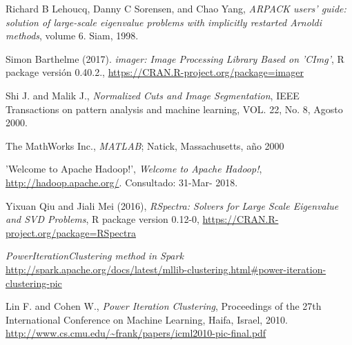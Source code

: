 \documentclass[conference]{IEEEtran}
\begin{document}
\begin{thebibliography}{1}
Richard B Lehoucq, Danny C Sorensen, and Chao Yang, \textit{ARPACK users' guide: solution of large-scale eigenvalue problems with implicitly restarted Arnoldi methods}, volume 6. Siam, 1998.


Simon Barthelme (2017). \emph{imager: Image Processing
  Library Based on 'CImg'}, R package versión  0.40.2., \url{  https://CRAN.R-project.org/package=imager}


Shi J. and Malik J., \emph{Normalized Cuts and Image Segmentation}, IEEE Transactions on pattern analysis and machine learning, VOL. 22, No. 8, Agosto 2000.


The MathWorks Inc., \emph{MATLAB}; Natick, Massachusetts, año 2000



'Welcome to Apache Hadoop!',  \emph{Welcome to Apache Hadoop!}, \url{http://hadoop.apache.org/}. Consultado: 31-Mar-
2018.


Yixuan Qiu and Jiali Mei (2016), \emph{RSpectra: Solvers for Large Scale Eigenvalue and SVD Problems}, R package version 0.12-0, \url{https://CRAN.R-project.org/package=RSpectra}


\emph{PowerIterationClustering method in Spark} \url{http://spark.apache.org/docs/latest/mllib-clustering.html#power-iteration-clustering-pic}

Lin F. and Cohen W., \emph{Power Iteration Clustering}, Proceedings of the 27th International Conference on Machine Learning, Haifa, Israel, 2010. \url{http://www.cs.cmu.edu/~frank/papers/icml2010-pic-final.pdf}


\end{thebibliography}
\end{document}
